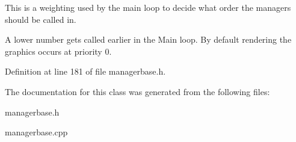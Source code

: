 This is a weighting used by the main loop to decide what order the managers should be called in. 

A lower number gets called earlier in the Main loop. By default rendering the graphics occurs at priority 0. 

Definition at line 181 of file managerbase.h.



The documentation for this class was generated from the following files:\begin{DoxyCompactItemize}
\item 
managerbase.h\item 
managerbase.cpp\end{DoxyCompactItemize}

